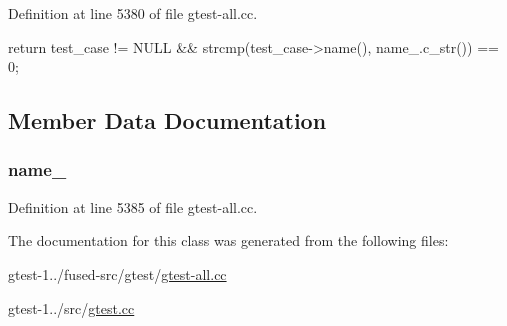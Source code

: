\-Definition at line 5380 of file gtest-\/all.\-cc.


\begin{DoxyCode}
                                                   {
    return test_case != NULL && strcmp(test_case->name(), name_.c_str()) == 0;
  }
\end{DoxyCode}


\subsection{\-Member \-Data \-Documentation}
\hypertarget{classtesting_1_1internal_1_1TestCaseNameIs_a46d25a1d56b8ab56e84b8bd0c7581e8f}{
\subsubsection[{name\-\_\-}]{ {\bf name\-\_\-}}}\label{df/d02/classtesting_1_1internal_1_1TestCaseNameIs_a46d25a1d56b8ab56e84b8bd0c7581e8f}


\-Definition at line 5385 of file gtest-\/all.\-cc.



\-The documentation for this class was generated from the following files\-:\begin{DoxyCompactItemize}
\item 
gtest-\/1../fused-\/src/gtest/\hyperlink{fused-src_2gtest_2gtest-all_8cc}{gtest-\/all.\-cc}\item 
gtest-\/1../src/\hyperlink{gtest_8cc}{gtest.\-cc}\end{DoxyCompactItemize}
